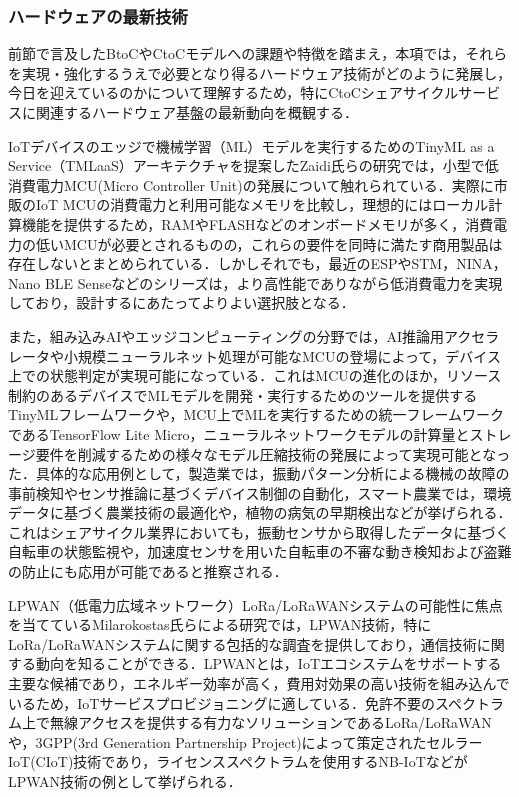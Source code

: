       \subsubsection{ハードウェアの最新技術}
        \label{sec:ハードウェアの最新技術}
          \par 前節で言及したBtoCやCtoCモデルへの課題や特徴を踏まえ，本項では，それらを実現・強化するうえで必要となり得るハードウェア技術がどのように発展し，今日を迎えているのかについて理解するため，特にCtoCシェアサイクルサービスに関連するハードウェア基盤の最新動向を概観する．
          \par IoTデバイスのエッジで機械学習（ML）モデルを実行するためのTinyML as a Service（TMLaaS）アーキテクチャを提案したZaidi氏らの研究では，小型で低消費電力MCU(Micro Controller Unit)の発展について触れられている．実際に市販のIoT MCUの消費電力と利用可能なメモリを比較し，理想的にはローカル計算機能を提供するため，RAMやFLASHなどのオンボードメモリが多く，消費電力の低いMCUが必要とされるものの，これらの要件を同時に満たす商用製品は存在しないとまとめられている．しかしそれでも，最近のESPやSTM，NINA，Nano BLE Senseなどのシリーズは，より高性能でありながら低消費電力を実現しており，設計するにあたってよりよい選択肢となる．
          \par また，組み込みAIやエッジコンピューティングの分野では，AI推論用アクセラレータや小規模ニューラルネット処理が可能なMCUの登場によって，デバイス上での状態判定が実現可能になっている．これはMCUの進化のほか，リソース制約のあるデバイスでMLモデルを開発・実行するためのツールを提供するTinyMLフレームワークや，MCU上でMLを実行するための統一フレームワークであるTensorFlow Lite Micro，ニューラルネットワークモデルの計算量とストレージ要件を削減するための様々なモデル圧縮技術の発展によって実現可能となった．具体的な応用例として，製造業では，振動パターン分析による機械の故障の事前検知やセンサ推論に基づくデバイス制御の自動化，スマート農業では，環境データに基づく農業技術の最適化や，植物の病気の早期検出などが挙げられる．これはシェアサイクル業界においても，振動センサから取得したデータに基づく自転車の状態監視や，加速度センサを用いた自転車の不審な動き検知および盗難の防止にも応用が可能であると推察される．
          \par LPWAN（低電力広域ネットワーク）LoRa/LoRaWANシステムの可能性に焦点を当てているMilarokostas氏らによる研究では，LPWAN技術，特にLoRa/LoRaWANシステムに関する包括的な調査を提供しており，通信技術に関する動向を知ることができる．LPWANとは，IoTエコシステムをサポートする主要な候補であり，エネルギー効率が高く，費用対効果の高い技術を組み込んでいるため，IoTサービスプロビジョニングに適している．免許不要のスペクトラム上で無線アクセスを提供する有力なソリューションであるLoRa/LoRaWANや，3GPP(3rd Generation Partnership Project)によって策定されたセルラーIoT(CIoT)技術であり，ライセンススペクトラムを使用するNB-IoTなどがLPWAN技術の例として挙げられる．
